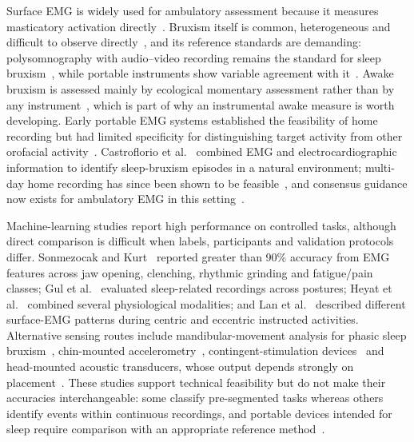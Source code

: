 \documentclass[pdflatex,sn-nature,iicol]{sn-jnl}
\begin{document}
Surface EMG is widely used for ambulatory assessment because it measures masticatory activation directly~\cite{raez2006techniques,farella2008masticatory}. Bruxism itself is common, heterogeneous and difficult to observe directly~\cite{lavigne2008bruxism,manfredini2013epidemiology,melo2019bruxism,wetselaar2019prevalence}, and its reference standards are demanding: polysomnography with audio--video recording remains the standard for sleep bruxism~\cite{lavigne1996sleep,stuginski2016detection}, while portable instruments show variable agreement with it~\cite{casett2017validity,cidverdejo2024instrumental}. Awake bruxism is assessed mainly by ecological momentary assessment rather than by any instrument~\cite{bracci2018frequency,zani2019ecological}, which is part of why an instrumental awake measure is worth developing. Early portable EMG systems established the feasibility of home recording but had limited specificity for distinguishing target activity from other orofacial activity~\cite{stuginski2016detection}. Castroflorio et al.~\cite{castroflorio2013use,castroflorio2014detection} combined EMG and electrocardiographic information to identify sleep-bruxism episodes in a natural environment; multi-day home recording has since been shown to be feasible~\cite{colonna2023electromyographic}, and consensus guidance now exists for ambulatory EMG in this setting~\cite{lobbezoo2020consensus}.

Machine-learning studies report high performance on controlled tasks, although direct comparison is difficult when labels, participants and validation protocols differ. Sonmezocak and Kurt~\cite{sonmezocak2021detection} reported greater than 90\% accuracy from EMG features across jaw opening, clenching, rhythmic grinding and fatigue/pain classes; Gul et al.~\cite{gul2024advanced} evaluated sleep-related recordings across postures; Heyat et al.~\cite{heyat2020computational} combined several physiological modalities; and Lan et al.~\cite{lan2022comparative} described different surface-EMG patterns during centric and eccentric instructed activities. Alternative sensing routes include mandibular-movement analysis for phasic sleep bruxism~\cite{martinot2021artificial}, chin-mounted accelerometry~\cite{patwa2017bruxism}, contingent-stimulation devices~\cite{haugland2020automatic} and head-mounted acoustic transducers, whose output depends strongly on placement~\cite{romano2024wearable}. These studies support technical feasibility but do not make their accuracies interchangeable: some classify pre-segmented tasks whereas others identify events within continuous recordings, and portable devices intended for sleep require comparison with an appropriate reference method~\cite{cidverdejo2024instrumental}.
\end{document}
